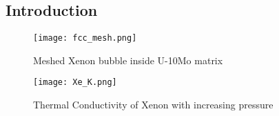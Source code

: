 \begin{doublespacing}

\section{Introduction}
\begin{figure}[H]
\centering
\texttt{[image: fcc\_mesh.png]}
\caption{Meshed Xenon bubble inside U-10Mo matrix}
\label{fcc_mesh}
\end{figure}


\begin{figure}[H]
\centering
\texttt{[image: Xe\_K.png]}
\caption{Thermal Conductivity of Xenon with increasing pressure}
\label{fig_Xe_K}
\end{figure}


\end{doublespacing}
